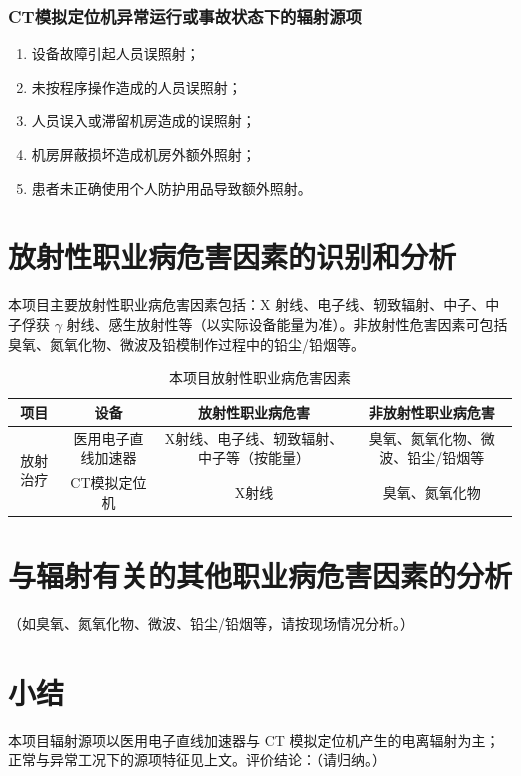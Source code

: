 \subsubsection{CT模拟定位机异常运行或事故状态下的辐射源项}

\begin{enumerate}
\item 设备故障引起人员误照射；
\item 未按程序操作造成的人员误照射；
\item 人员误入或滞留机房造成的误照射；
\item 机房屏蔽损坏造成机房外额外照射；
\item 患者未正确使用个人防护用品导致额外照射。
\end{enumerate}

\section{放射性职业病危害因素的识别和分析}

本项目主要放射性职业病危害因素包括：X 射线、电子线、轫致辐射、中子、中子俘获 $\gamma$ 射线、感生放射性等（以实际设备能量为准）。非放射性危害因素可包括臭氧、氮氧化物、微波及铅模制作过程中的铅尘/铅烟等。

\begin{table}[H]
\centering
\caption{本项目放射性职业病危害因素}
\label{tab:ch3-linac-haz}
\begin{tabular}{|c|c|c|c|}
\hline
项目 & 设备 & 放射性职业病危害 & 非放射性职业病危害 \\
\hline
\multirow{2}{*}{放射治疗}
& 医用电子直线加速器 & X射线、电子线、轫致辐射、中子等（按能量） & 臭氧、氮氧化物、微波、铅尘/铅烟等 \\
\cline{2-4}
& CT模拟定位机 & X射线 & 臭氧、氮氧化物 \\
\hline
\end{tabular}
\end{table}

\section{与辐射有关的其他职业病危害因素的分析}

（如臭氧、氮氧化物、微波、铅尘/铅烟等，请按现场情况分析。）

\section{小结}

本项目辐射源项以医用电子直线加速器与 CT 模拟定位机产生的电离辐射为主；正常与异常工况下的源项特征见上文。评价结论：（请归纳。）
